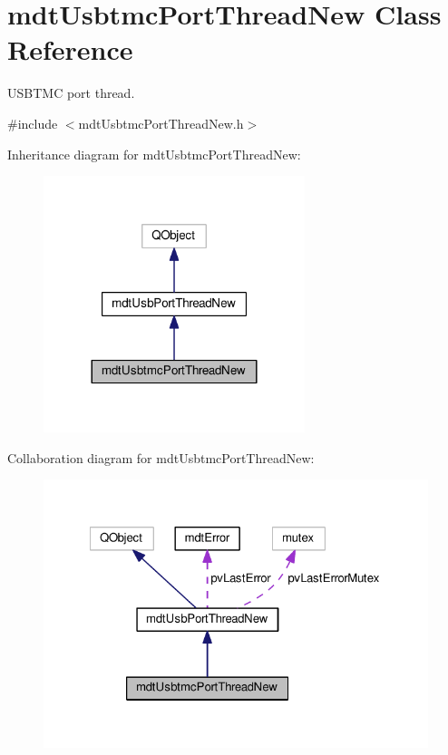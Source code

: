 \hypertarget{classmdt_usbtmc_port_thread_new}{\section{mdt\-Usbtmc\-Port\-Thread\-New Class Reference}
\label{classmdt_usbtmc_port_thread_new}
}


U\-S\-B\-T\-M\-C port thread.  




{\ttfamily \#include $<$mdt\-Usbtmc\-Port\-Thread\-New.\-h$>$}



Inheritance diagram for mdt\-Usbtmc\-Port\-Thread\-New\-:
\nopagebreak
\begin{figure}[H]
\begin{center}
\leavevmode
\includegraphics[width=216pt]{classmdt_usbtmc_port_thread_new__inherit__graph}
\end{center}
\end{figure}


Collaboration diagram for mdt\-Usbtmc\-Port\-Thread\-New\-:
\nopagebreak
\begin{figure}[H]
\begin{center}
\leavevmode
\includegraphics[width=324pt]{classmdt_usbtmc_port_thread_new__coll__graph}
\end{center}
\end{figure}
